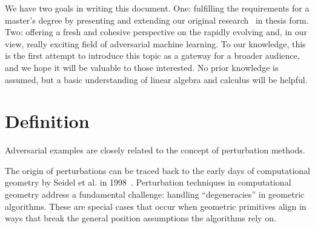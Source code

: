 \documentclass[a4paper, oneside]{discothesis}
\begin{document}
We have two goals in writing this document. One: fulfilling the requirements for a master's degree by presenting and extending our original research~\cite{jabary2024seeing} in thesis form. Two: offering a fresh and cohesive perspective on the rapidly evolving and, in our view, really exciting field of adversarial machine learning. To our knowledge, this is the first attempt to introduce this topic as a gateway for a broader audience, and we hope it will be valuable to those interested. No prior knowledge is assumed, but a basic understanding of linear algebra and calculus will be helpful.

\section{Definition}

Adversarial examples are closely related to the concept of perturbation methods.

The origin of perturbations can be traced back to the early days of computational geometry by Seidel et al. in 1998~\cite{seidel1998nature}. Perturbation techniques in computational geometry address a fundamental challenge: handling ``degeneracies'' in geometric algorithms. These are special cases that occur when geometric primitives align in ways that break the general position assumptions the algorithms rely on.
\end{document}
